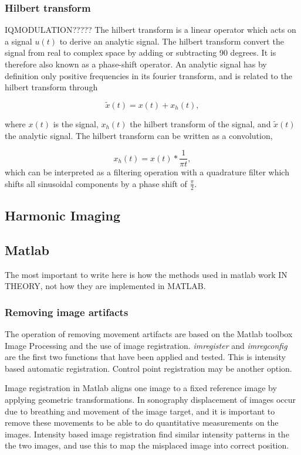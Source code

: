 \subsubsection{Hilbert transform}
IQMODULATION?????
The hilbert transform is a linear operator which acts on a signal $u(t)$ to derive an analytic signal. The hilbert transform convert the signal from real to complex space by adding or subtracting 90 degrees. It is therefore also known as a phase-shift operator. An analytic signal has by definition only positive frequencies in its fourier transform, and is related to the hilbert transform through 

\begin{equation}
\tilde{x}(t) = x(t) + x_h(t),
\end{equation}

where $x(t)$ is the signal, $x_h(t)$ the hilbert transform of the signal, and $\tilde{x}(t)$ the analytic signal. The hilbert transform can be written as a convolution, 

\begin{equation}
x_h(t) = x(t)*\frac{1}{\pi t},
\end{equation}
which can be interpreted as a filtering operation with a quadrature filter which shifts all sinusoidal components by a phase shift of $\frac{\pi}{2}$.

\subsection{Harmonic Imaging}

\subsection{Matlab}
The most important to write here is how the methods used in matlab work IN THEORY, not how they are implemented in MATLAB.


\subsubsection{Removing image artifacts}
The operation of removing movement artifacts are based on the Matlab toolbox Image Processing and the use of image registration. \textit{imregister} and \textit{imregconfig} are the first two functions that have been applied and tested. This is intensity based automatic registration. Control point registration may be another option.

Image registration in Matlab aligns one image to a fixed reference image by applying geometric transformations. In sonography displacement of images occur due to breathing and movement of the image target, and it is important to remove these movements to be able to do quantitative measurements on the images. Intensity based image registration find similar intensity patterns in the    the two images, and use this to map the misplaced image into correct position. 

